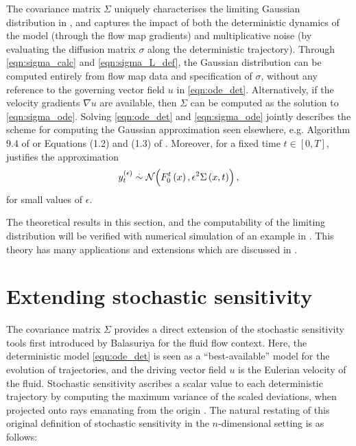 The covariance matrix \(\Sigma\) uniquely characterises the limiting Gaussian distribution in , and captures the impact of both the deterministic dynamics of the model (through the flow map gradients) and multiplicative noise (by evaluating the diffusion matrix \(\sigma\) along the deterministic trajectory).
Through \eqref{eqn:sigma_calc} and \eqref{eqn:sigma_L_def}, the Gaussian distribution can be computed entirely from flow map data and specification of \(\sigma\), without any reference to the governing vector field \(u\) in \eqref{eqn:ode_det}.
Alternatively, if the velocity gradients \(\nabla u\) are available, then \(\Sigma\) can be computed as the solution to \eqref{eqn:sigma_ode}.
Solving \eqref{eqn:ode_det} and \eqref{eqn:sigma_ode} jointly describes the scheme for computing the Gaussian approximation seen elsewhere, e.g. Algorithm 9.4 of \cite{SarkkaSolin_2019_AppliedStochasticDifferential} or Equations (1.2) and (1.3) of \cite{Sanz-AlonsoStuart_2017_GaussianApproximationsSmall}.
Moreover, for a fixed time \(t \in [0,T]\),  justifies the approximation
\begin{equation}
	y_t^{\left(\epsilon\right)} \stackrel{.}{\sim} \mathcal{N}\!\left(F_0^t\left(x\right), \epsilon^2 \Sigma\left(x,t\right)\right),
	\label{eqn:y_t_gauss}
\end{equation}
for small values of \(\epsilon\).

The theoretical results in this section, and the computability of the limiting distribution will be verified with numerical simulation of an example in .
This theory has many applications and extensions which are discussed in .


\section{Extending stochastic sensitivity}\label{sec:theory_s2}

The covariance matrix \(\Sigma\) provides a direct extension of the stochastic sensitivity tools first introduced by Balasuriya \cite{Balasuriya_2020_StochasticSensitivityComputable} for the fluid flow context.
Here, the deterministic model \eqref{eqn:ode_det} is seen as a ``best-available'' model for the evolution of trajectories, and the driving vector field \(u\) is the Eulerian velocity of the fluid.
Stochastic sensitivity ascribes a scalar value to each deterministic trajectory by computing the maximum variance of the scaled deviations, when projected onto rays emanating from the origin \cite{Balasuriya_2020_StochasticSensitivityComputable}.
The natural restating of this original definition of stochastic sensitivity \cite{Balasuriya_2020_StochasticSensitivityComputable} in the $ n $-dimensional setting is as follows:

